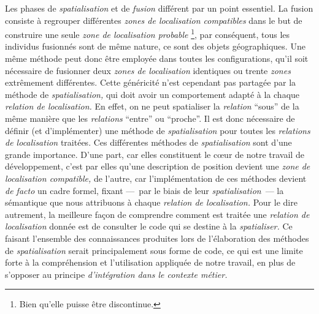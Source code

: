 Les phases de \emph{spatialisation} et de \emph{fusion} différent par
un point essentiel. La fusion consiste à regrouper différentes
\emph{zones de localisation compatibles} dans le but de construire une
seule \emph{zone de localisation probable} \footnote{Bien qu'elle
  puisse être discontinue.}, par conséquent, tous les individus
fusionnés sont de même nature, ce sont des objets géographiques. Une
même méthode peut donc être employée dans toutes les configurations,
qu'il soit nécessaire de fusionner deux \emph{zones de localisation}
identiques ou trente \emph{zones} extrêmement différentes. Cette
généricité n'est cependant pas partagée par la méthode de
\emph{spatialisation,} qui doit avoir un comportement adapté à la
chaque \emph{relation de localisation.} En effet, on ne peut
spatialiser la \emph{relation} \enquote{sous} de la même manière que
les \emph{relations} \enquote{entre} ou \enquote{proche}. Il est donc
nécessaire de définir (et d'implémenter) une méthode de
\emph{spatialisation} pour toutes les \emph{relations de localisation}
traitées. Ces différentes méthodes de \emph{spatialisation} sont d'une
grande importance. D'une part, car elles constituent le cœur de notre
travail de développement, c'est par elles qu'une description de
position devient une \emph{zone de localisation compatible,} de
l'autre, car l'implémentation de ces méthodes devient \emph{de facto}
un cadre formel, fixant ---~par le biais de leur
\emph{spatialisation}~--- la sémantique que nous attribuons à chaque
\emph{relation de localisation.} Pour le dire autrement, la meilleure
façon de comprendre comment est traitée une \emph{relation de
  localisation} donnée est de consulter le code qui se destine à la
\emph{spatialiser.} Ce faisant l'ensemble des connaissances produites
lors de l'élaboration des méthodes de \emph{spatialisation} serait
principalement sous forme de code, ce qui est une limite forte à la
compréhension et l'utilisation appliquée de notre travail, en plus de
s'opposer au principe \emph{d'intégration dans le contexte métier.}


